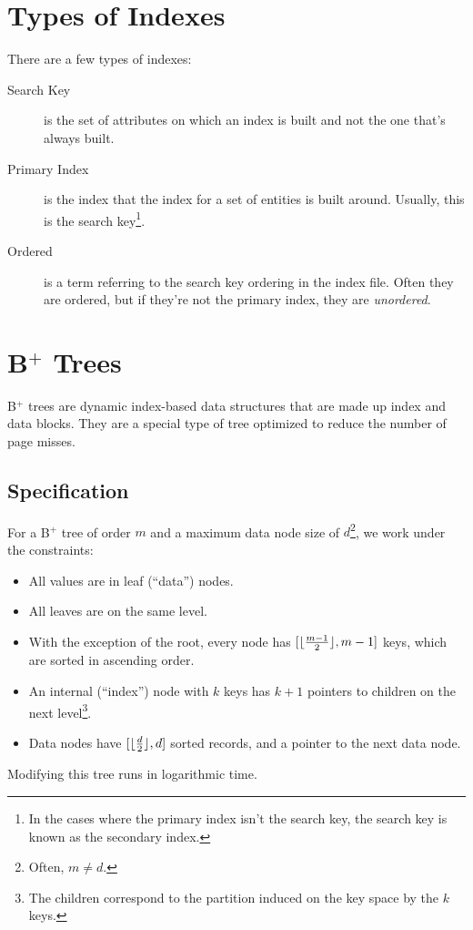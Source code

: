             \section{Types of Indexes} %
            \label{sec:types_of_indices}
                There are a few types of indexes:
                \begin{description}
                    \item[Search Key] is the set of attributes on which an index is built and not the one that's always built.
                    \item[Primary Index] is the index that the index for a set of entities is built around.
                    Usually, this is the search key\footnote{In the cases where the primary index isn't the search key, the search key is known as the secondary index.}.
                    \item[Ordered] is a term referring to the search key ordering in the index file.
                    Often they are ordered, but if they're not the primary index, they are \textit{unordered}.
                \end{description}
            \section{B$^+$ Trees} %
            \label{sec:b_trees}
                B$^+$ trees are dynamic index-based data structures that are made up index and data blocks.
                They are a special type of tree optimized to reduce the number of page misses.
                \subsection{Specification} %
                \label{sub:specification}
                    For a B$^+$ tree of order $m$ and a maximum data node size of $d$\footnote{Often, $m \ne d$.}, we work under the constraints:
                    \begin{itemize}
                        \item All values are in leaf (``data'') nodes.
                        \item All leaves are on the same level.
                        \item With the exception of the root, every node has $[\lfloor\frac{m-1}{2}\rfloor, m-1]$ keys, which are sorted in ascending order.
                        \item An internal (``index'') node with $k$ keys has $k+1$ pointers to children on the next level\footnote{The children correspond to the partition induced on the key space by the $k$ keys.}.
                        \item Data nodes have $[\lfloor\frac{d}{2}\rfloor, d]$ sorted records, and a pointer to the next data node.
                    \end{itemize}
				Modifying this tree runs in logarithmic time.
					
